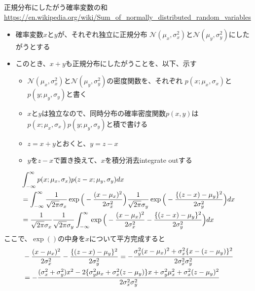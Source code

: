 \documentclass[aspectratio=169,unicode,dvipdfmx,14pt]{beamer}
\begin{document}
\begin{frame}{正規分布にしたがう確率変数の和\\\vspace{-.3in}\href{https://en.wikipedia.org/wiki/Sum_of_normally_distributed_random_variables}{\footnotesize \url{https://en.wikipedia.org/wiki/Sum_of_normally_distributed_random_variables}}}
\begin{itemize}
\item 確率変数$x$と$y$が、それぞれ独立に正規分布
$\mathcal{N}(\mu_x,\sigma_x^2)$と$\mathcal{N}(\mu_y,\sigma_y^2)$にしたがうとする
\item このとき、$x+y$も正規分布にしたがうことを、以下、示す
\begin{itemize}
\item $\mathcal{N}(\mu_x,\sigma_x^2)$と$\mathcal{N}(\mu_y,\sigma_y^2)$の密度関数を、それぞれ
$p(x;\mu_x,\sigma_x)$と$p(y;\mu_y,\sigma_y)$と書く
\item $x$と$y$は独立なので、同時分布の確率密度関数$p(x,y)$は$p(x;\mu_x,\sigma_x)p(y;\mu_y,\sigma_y)$と積で書ける
\item $z=x+y$とおくと、$y=z-x$
\item $y$を$z-x$で置き換えて、$x$を積分消去integrate outする
\end{itemize}
\end{itemize}
\end{frame}

\begin{frame}
\FontMath
\begin{align}
& \int_{-\infty}^{\infty}
p(x;\mu_x,\sigma_x)p(z-x;\mu_y,\sigma_y)dx
\notag \\
& = \int_{-\infty}^{\infty}
\frac{1}{\sqrt{2\pi}\sigma_x}\exp\Big(-\frac{(x-\mu_x)^2}{2\sigma_x^2}\Big)
\frac{1}{\sqrt{2\pi}\sigma_y}\exp\Big(-\frac{\{(z-x)-\mu_y\}^2}{2\sigma_y^2}\Big)dx
\notag \\
& = 
\frac{1}{\sqrt{2\pi}\sigma_x}
\frac{1}{\sqrt{2\pi}\sigma_y}
\int_{-\infty}^{\infty}
\exp\Big(-\frac{(x-\mu_x)^2}{2\sigma_x^2}
-\frac{\{(z-x)-\mu_y\}^2}{2\sigma_y^2}\Big)dx
\end{align}
ここで、$\exp()$の中身を$x$について平方完成すると
\begin{align}
& -\frac{(x-\mu_x)^2}{2\sigma_x^2}
-\frac{\{(z-x)-\mu_y\}^2}{2\sigma_y^2}
=
-\frac{\sigma_y^2(x-\mu_x)^2 + \sigma_x^2\{x-(z-\mu_y)\}^2}{2\sigma_x^2\sigma_y^2}
\notag \\ & =
-\frac{(\sigma_x^2+\sigma_y^2)x^2-2\{\sigma_y^2\mu_x+\sigma_x^2(z-\mu_y)\}x
+\sigma_y^2\mu_x^2+\sigma_x^2(z-\mu_y)^2}
{2\sigma_x^2\sigma_y^2}
\end{align}
\end{frame}
\end{document}
